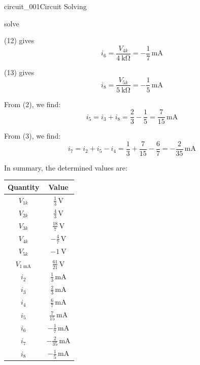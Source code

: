 \begin{mainquestion}{circuit_001}{Circuit Solving}
\begin{partquestion}{solve}
\begin{answer}
(12) gives
\[
i_6 = \frac{V_{4k}}{\qty{4}{\kilo\ohm}} = -\frac{1}{7}\,\mathrm{mA}
\]

(13) gives
\[
i_8 = \frac{V_{5k}}{\qty{5}{\kilo\ohm}} = -\frac{1}{5}\,\mathrm{mA}
\]

From (2), we find:
\[
i_5 = i_3 + i_8 = \frac{2}{3} - \frac{1}{5} = \frac{7}{15}\,\mathrm{mA}
\]

From (3), we find:
\[
i_7 = i_2 + i_5 - i_4
= \frac{1}{3} + \frac{7}{15} - \frac{6}{7}
= -\frac{2}{35}\,\mathrm{mA}
\]

In summary, the determined values are:

\begin{table}[htbp]
\centering
\renewcommand{\arraystretch}{1.15}
\begin{tabular}{|c|c|}
\hline
\textbf{Quantity} & \textbf{Value} \\ \hline

$V_{1k}$ & $\tfrac{1}{3}\,\mathrm{V}$ \\ \hline
$V_{2k}$ & $\tfrac{4}{3}\,\mathrm{V}$ \\ \hline
$V_{3k}$ & $\tfrac{18}{7}\,\mathrm{V}$ \\ \hline
$V_{4k}$ & $-\tfrac{4}{7}\,\mathrm{V}$ \\ \hline
$V_{5k}$ & $\qty{-1}{\volt}$ \\ \hline
$V_{\qty{1}{\milli\ampere}}$ & $\tfrac{61}{21}\,\mathrm{V}$ \\ \hline

$i_2$ & $\tfrac{1}{3}\,\mathrm{mA}$ \\ \hline
$i_3$ & $\tfrac{2}{3}\,\mathrm{mA}$ \\ \hline
$i_4$ & $\tfrac{6}{7}\,\mathrm{mA}$ \\ \hline
$i_5$ & $\tfrac{7}{15}\,\mathrm{mA}$ \\ \hline
$i_6$ & $-\tfrac{1}{7}\,\mathrm{mA}$ \\ \hline
$i_7$ & $-\tfrac{2}{35}\,\mathrm{mA}$ \\ \hline
$i_8$ & $-\tfrac{1}{5}\,\mathrm{mA}$ \\ \hline

\end{tabular}
\end{table}

\end{answer}
\end{partquestion}

\end{mainquestion}